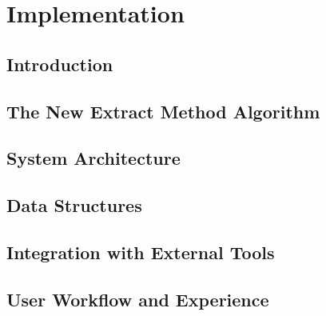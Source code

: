 \chapter[Chapter 3]{Implementation}
\label{chap:implementation}

\section{Introduction}
\label{sec:implementation_introduction}

\section{The New Extract Method Algorithm}
\label{sec:new_extract_method_algorithm}

\section{System Architecture}
\label{sec:system_architecture}

\section{Data Structures}
\label{sec:data_structures}

\section{Integration with External Tools}
\label{sec:integration_external_tools}

\section{User Workflow and Experience}
\label{sec:user_workflow_experience}
